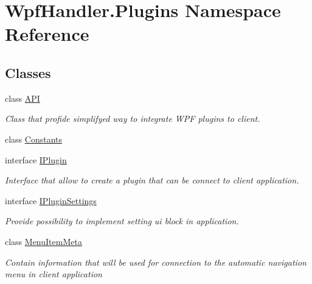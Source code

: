 \hypertarget{namespace_wpf_handler_1_1_plugins}{}\section{Wpf\+Handler.\+Plugins Namespace Reference}
\label{namespace_wpf_handler_1_1_plugins}
\subsection*{Classes}
\begin{DoxyCompactItemize}
\item 
class \mbox{\hyperlink{class_wpf_handler_1_1_plugins_1_1_a_p_i}{A\+PI}}
\begin{DoxyCompactList}\small\item\em Class that profide simplifyed way to integrate W\+PF plugins to client. \end{DoxyCompactList}\item 
class \mbox{\hyperlink{class_wpf_handler_1_1_plugins_1_1_constants}{Constants}}
\item 
interface \mbox{\hyperlink{interface_wpf_handler_1_1_plugins_1_1_i_plugin}{I\+Plugin}}
\begin{DoxyCompactList}\small\item\em Interface that allow to create a plugin that can be connect to client application. \end{DoxyCompactList}\item 
interface \mbox{\hyperlink{interface_wpf_handler_1_1_plugins_1_1_i_plugin_settings}{I\+Plugin\+Settings}}
\begin{DoxyCompactList}\small\item\em Provide possibility to implement setting ui block in application. \end{DoxyCompactList}\item 
class \mbox{\hyperlink{class_wpf_handler_1_1_plugins_1_1_menu_item_meta}{Menu\+Item\+Meta}}
\begin{DoxyCompactList}\small\item\em Contain information that will be used for connection to the automatic navigation menu in client application \end{DoxyCompactList}\end{DoxyCompactItemize}
